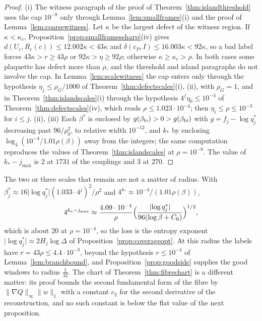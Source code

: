 \documentclass[11pt]{amsart}
\theoremstyle{definition}
\theoremstyle{remark}
\numberwithin{equation}{section}
\begin{document}
\begin{proof}
(i) The witness paragraph of the proof of Theorem~\ref{thm:islandthreshold}
uses the cap $10^{-8}$ only through Lemma~\ref{lem:smallframes}(i) and the
proof of Lemma~\ref{lem:coarsewitness}. Let $\kappa$ be the largest defect
of the witness region. If $\kappa<\kappa_c$, Proposition~\ref{prop:smallframessharp}(iv)
gives $d(U_e,R_e(c))\le12.002\kappa<43\kappa$ and $\delta(c_P,I)\le
16.003\kappa<92\kappa$, so a bad label forces $43\kappa>r\ge43\rho$ or $92\kappa>
\eta\ge92\rho$; otherwise $\kappa\ge\kappa_c>\rho$. In both cases some
plaquette has defect more than $\rho$, and the threshold and island
paragraphs do not involve the cap. In Lemma~\ref{lem:scalewitness} the cap
enters only through the hypothesis $\eta_j\le\rho_G/1000$ of
Theorem~\ref{thm:defectscales}(i), (ii), with $\rho_G=1$, and in
Theorem~\ref{thm:islandscales}(i) through the hypothesis $4^j\eta_0\le10^{-4}$
of Theorem~\ref{thm:defectscales}(iv), which reads $\rho\le1.023\cdot10^{-4}$;
then $\eta_i\le\rho\le10^{-3}$ for $i\le j$.
(ii), (iii) Each $\beta^*$ is enclosed by $g(\beta_{\rm lo})>0>g(\beta_{\rm
hi})$ with $g=f_j-\log q^*_j$ decreasing past $96/\rho_0^2$, to relative width
$10^{-12}$, and $k_*$ by enclosing $\log_4(10^{-4}/1.01\rho(\beta))$ away from
the integers; the same computation reproduces the values of
Theorem~\ref{thm:islandscales} at $\rho=10^{-8}$. The value of $k_*-j_{\max}$
is $2$ at $1731$ of the couplings and $3$ at $270$.
\end{proof}

The two or three scales that remain are not a matter of radius. With
$\beta^*_j\approx16\lvert\log q^*_j\rvert(1.033\cdot4^j)^2/\rho^2$ and
$4^{k_*}\approx10^{-4}/(1.01\rho(\beta))$,
\[
4^{k_*-j_{\max}}\approx\frac{4.09\cdot10^{-4}}\rho\Bigl(\frac{\lvert\log
q^*_j\rvert}{96(\log\beta+C_0)}\Bigr)^{1/2},
\]
which is about $20$ at $\rho=10^{-4}$,
so the loss is the entropy exponent $\lvert\log q^*_j\rvert\approx2H_j\log
\varDelta$ of Proposition~\ref{prop:coverageopt}. At this radius the labels
have $r=43\rho\le4.4\cdot10^{-3}$, beyond the hypothesis $r\le10^{-4}$ of
Lemma~\ref{lem:branchbound}, and Proposition~\ref{prop:goodside} supplies the
good windows to radius $\frac1{32}$. The chart of Theorem~\ref{thm:fibrechart}
is a different matter: its proof bounds the second fundamental form of the
fibre by $\lVert\nabla Q\rVert_\infty\lVert\dot w\rVert_1$ with a constant
$c_2$ for the second derivative of the reconstruction, and no such constant
is below the flat value of the next proposition.
\end{document}
